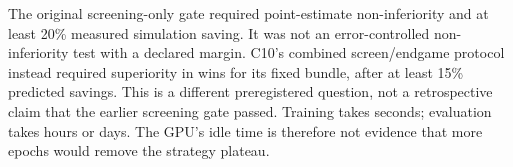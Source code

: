 The original screening-only gate required point-estimate non-inferiority
and at least 20\% measured simulation saving. It was not an error-controlled
non-inferiority test with a declared margin. C10's combined screen/endgame
protocol instead required superiority in wins for its fixed bundle, after
at least 15\% predicted savings. This is a different preregistered question,
not a retrospective claim that the earlier screening gate passed.
Training takes seconds; evaluation takes hours or days. The GPU's idle time
is therefore not evidence that more epochs would remove the strategy plateau.


